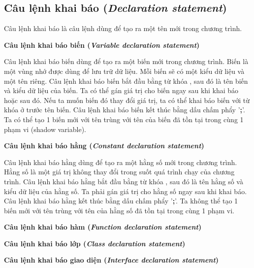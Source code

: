 \subsection{Câu lệnh khai báo (\textit{Declaration statement})}

\regexdeclstmt

Câu lệnh khai báo là câu lệnh dùng để tạo ra một tên mới trong chương trình. 

\noindent\textbf{Câu lệnh khai báo biến (\textit{Variable declaration statement})}

\regexvardeclstmt

Câu lệnh khai báo biến dùng để tạo ra một biến mới trong chương trình. Biến là một vùng nhớ được dùng để lưu trữ dữ liệu. Mỗi biến sẽ có một kiểu dữ liệu và một tên riêng. Câu lệnh khai báo biến bắt đầu bằng từ khóa , sau đó là tên biến và kiểu dữ liệu của biến. Ta có thể gán giá trị cho biến ngay sau khi khai báo hoặc sau đó. Nếu ta muốn biến đó thay đổi giá trị, ta có thể khai báo biến với từ khóa  ở trước tên biến. Câu lệnh khai báo biến kết thúc bằng dấu chấm phẩy '\textbf{;}'. Ta có thể tạo 1 biến mới với tên trùng với tên của biến đã tồn tại trong cùng 1 phạm vi (shadow variable).

\noindent\textbf{Câu lệnh khai báo hằng (\textit{Constant declaration statement})}

\regexconstdeclstmt

Câu lệnh khai báo hằng dùng để tạo ra một hằng số mới trong chương trình. Hằng số là một giá trị không thay đổi trong suốt quá trình chạy của chương trình. Câu lệnh khai báo hằng bắt đầu bằng từ khóa , sau đó là tên hằng số và kiểu dữ liệu của hằng số. Ta phải gán giá trị cho hằng số ngay sau khi khai báo. Câu lệnh khai báo hằng kết thúc bằng dấu chấm phẩy '\textbf{;}'. Ta không thể tạo 1 biến mới với tên trùng với tên của hằng số đã tồn tại trong cùng 1 phạm vi.

\noindent\textbf{Câu lệnh khai báo hàm (\textit{Function declaration statement})}

\noindent\textbf{Câu lệnh khai báo lớp (\textit{Class declaration statement})}

\noindent\textbf{Câu lệnh khai báo giao diện (\textit{Interface declaration statement})}
